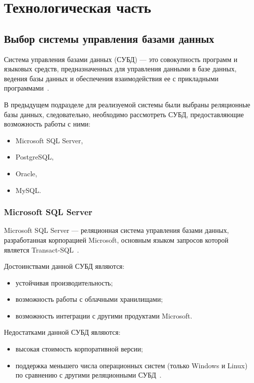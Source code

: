 \chapter{Технологическая часть}

\section{Выбор системы управления базами данных}

Система управления базами данных (СУБД) --- это совокупность программ и языковых
средств, предназначенных для управления данными в базе данных, ведения базы
данных и обеспечения взаимодействия ее с прикладными программами~\cite{gost01}.

В предыдущем подразделе для реализуемой системы были выбраны реляционные
базы данных, следовательно, необходимо рассмотреть СУБД, предоставляющие
возможность работы с ними:
\begin{itemize}
    \item Microsoft SQL Server,
    \item PostgreSQL,
    \item Oracle,
    \item MySQL.
\end{itemize}

\subsection{Microsoft SQL Server}

Microsoft SQL Server --- реляционная система управления базами данных,
разработанная корпорацией Microsoft, основным языком запросов
которой является Transact-SQL~\cite{art06}.

Достоинствами данной СУБД являются:
\begin{itemize}
    \item устойчивая производительность;
    \item возможность работы с облачными хранилищами;
    \item возможность интеграции с другими продуктами Microsoft.
\end{itemize}

Недостатками данной СУБД являются:
\begin{itemize}
    \item высокая стоимость корпоративной версии;
    \item поддержка меньшего числа операционных систем (только Windows
        и Linux) по сравнению с другими реляционными СУБД~\cite{art07}.
\end{itemize}

